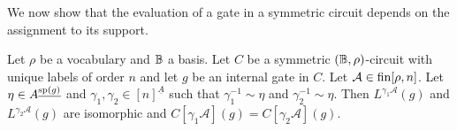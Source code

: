 \documentclass[../main/thesis.tex]{subfiles}
\begin{document}






We now show that the evaluation of a gate in a symmetric circuit depends on the
assignment to its support.

\begin{lem}
  Let $\rho$ be a vocabulary and $\mathbb{B}$ a basis. Let $C$ be a symmetric $(\mathbb{B},
  \rho)$-circuit with unique labels of order $n$ and let $g$ be an internal gate
  in $C$. Let $\mathcal{A} \in \text{\upshape fin}{[\rho, n]}$. Let $\eta \in
  A^{\underline{\text{sp}(g)}}$ and $\gamma_1, \gamma_2 \in [n]^{\underline{A}}$
  such that $\gamma^{-1}_1 \sim \eta$ and $\gamma^{-1}_2 \sim \eta$. Then
  $L^{\gamma_1 \mathcal{A}}(g)$ and $L^{\gamma_2 \mathcal{A}}(g)$ are isomorphic
  and $C[\gamma_1 \mathcal{A}](g) = C[\gamma_2 \mathcal{A}](g)$.
	\label{lem:support-determines-evaluation}
\end{lem}
\end{document}
